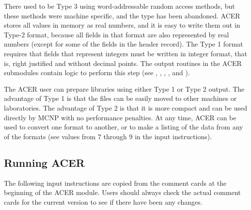 \noindent
There used to be Type 3 using word-addressable random access
methods, but these methods were machine specific, and the
type has been abandoned.
ACER stores all values in memory as real numbers, and it is easy
to write them out in Type-2 format, because all fields in that format
are also represented by real numbers (except for some of the fields
in the header record).  The Type 1 format requires that fields
that represent integers must be written in integer format,
that is, right justified and without decimal points.
The output routines in the ACER submodules contain logic to
perform this step (see , , ,
, and ).

The ACER user can prepare libraries using either Type 1 or Type 2
output.  The advantage of Type 1 is that the files can be easily moved
to other machines or laboratories.  The advantage of Type 2 is that
it is more compact and can be used directly by MCNP with no performance
penalties.  At any time, ACER can be used to convert one format to
another, or to make a listing of the data from any of the formats (see
 values from 7 through 9 in the input instructions).

\subsection{Running ACER}
\label{ssACER_running}

The following input instructions are copied from the comment
cards at the beginning of the ACER module.  Users
should always check the actual comment cards for the current
version to see if there have been any changes.

